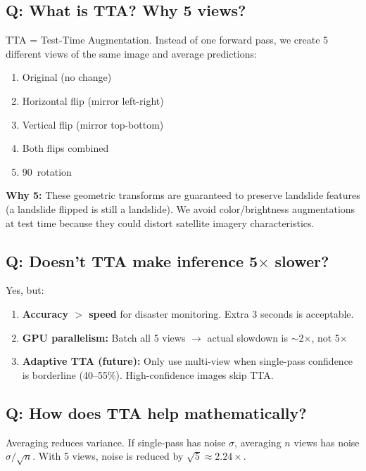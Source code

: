 \documentclass[11pt]{article}
\begin{document}
\subsection{Q: What is TTA? Why 5 views?}

TTA = Test-Time Augmentation. Instead of one forward pass, we create 5 different views of the same image and average predictions:

\begin{enumerate}[noitemsep]
    \item Original (no change)
    \item Horizontal flip (mirror left-right)
    \item Vertical flip (mirror top-bottom)
    \item Both flips combined
    \item 90\textdegree\ rotation
\end{enumerate}

\textbf{Why 5:} These geometric transforms are guaranteed to preserve landslide features (a landslide flipped is still a landslide). We avoid color/brightness augmentations at test time because they could distort satellite imagery characteristics.

\subsection{Q: Doesn't TTA make inference 5$\times$ slower?}

Yes, but:
\begin{enumerate}[noitemsep]
    \item \textbf{Accuracy $>$ speed} for disaster monitoring. Extra 3 seconds is acceptable.
    \item \textbf{GPU parallelism:} Batch all 5 views $\to$ actual slowdown is $\sim$2$\times$, not 5$\times$
    \item \textbf{Adaptive TTA (future):} Only use multi-view when single-pass confidence is borderline (40--55\%). High-confidence images skip TTA.
\end{enumerate}

\subsection{Q: How does TTA help mathematically?}

Averaging reduces variance. If single-pass has noise $\sigma$, averaging $n$ views has noise $\sigma / \sqrt{n}$. With 5 views, noise is reduced by $\sqrt{5} \approx 2.24\times$.
\end{document}
